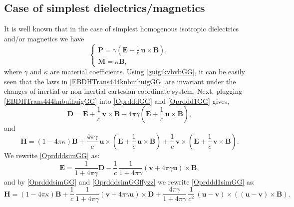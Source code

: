 \documentclass{article}
\theoremstyle{definition}
\theoremstyle{remark}
\renewcommand{\vec}[1]{\mathbf{#1}}
\newcommand{\R}{\mathbb{R}}
\newcommand{\er}{\eqref}
\newcommand{\R}{{\mathbb{R}}}
\newcommand{\er}{\eqref}
\begin{document}
\subsection{Case of simplest dielectrics/magnetics} It is well
known that in the case of simplest homogenous isotropic dielectrics
and/or magnetics we have
\begin{equation}\label{EBDHTrans444knbuihuigGG}
\begin{cases}
\vec P=\gamma\left(\vec E+\frac{1}{c}\,\vec u\times \vec B\right),\\
\vec M=\kappa\vec B,
\end{cases}
\end{equation}
where $\gamma$ and $\kappa$ are material coefficients.
Using \er{guigikvbvbGG}, it can be easily seen that the laws in
\er{EBDHTrans444knbuihuigGG} are invariant under the changes of
inertial or non-inertial cartesian coordinate system. Next, plugging
\er{EBDHTrans444knbuihuigGG} into \er{OprdddGG} and \er{Oprddd1GG}
gives,
\begin{equation}\label{OprdddsimGG}
\vec D=\vec E+\frac{1}{c}\,\vec v\times \vec B+4\pi\gamma\left(\vec
E+\frac{1}{c}\,\vec u\times \vec B\right),
\end{equation}
and
\begin{equation}\label{Oprddd1simGG}
\vec H=\left(1-4\pi \kappa\right)\vec B+\frac{4\pi\gamma}{c}\,\vec
u\times \left(\vec E+\frac{1}{c}\,\vec u\times \vec
B\right)+\frac{1}{c}\,\vec v\times\left(\vec E+\frac{1}{c}\,\vec
v\times \vec B\right).
\end{equation}
We rewrite \er{OprdddsimGG} as:
\begin{equation}\label{OprdddsimGGffyzz}
\vec E=\frac{1}{1+4\pi\gamma}\vec
D-\frac{1}{c}\,\frac{1}{1+4\pi\gamma}\left(\vec v+4\pi\gamma\vec
u\right)\times \vec B,
\end{equation}
and by \er{OprdddsimGG} and \er{OprdddsimGGffyzz} we rewrite
\er{Oprddd1simGG} as:
\begin{equation}\label{Oprddd1simGGffyzz}
\vec H=\left(1-4\pi \kappa\right)\vec
B+\frac{1}{c}\,\frac{1}{1+4\pi\gamma}\left(\vec v+4\pi\gamma\vec
u\right)\times \vec
D+\frac{4\pi\gamma}{1+4\pi\gamma}\,\frac{1}{c^2}\,(\vec u-\vec
v)\times\left(\left(\vec u-\vec v\right)\times \vec B\right).
\end{equation}
\end{document}
